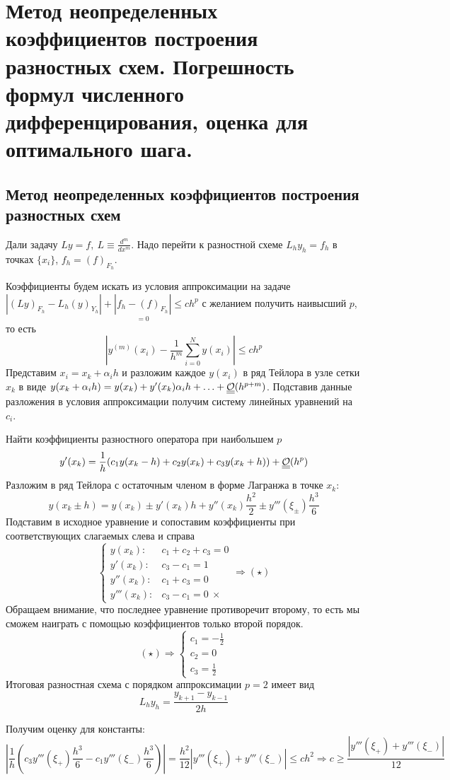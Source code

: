 \section{Метод неопределенных коэффициентов построения
  разностных схем. Погрешность формул
  численного дифференцирования, оценка для оптимального шага.}

\subsection*{Метод неопределенных коэффициентов построения разностных схем}
Дали задачу $Ly=f,\ L\equiv\frac{d^m}{dx^m}$. Надо перейти к разностной схеме
$L_hy_h=f_h$ в точках $\{x_i\}$, $f_h=(f)_{F_h}$.

Коэффициенты будем искать из условия аппроксимации на задаче
$|(Ly)_{F_h}-L_h(y)_{Y_h}|+\underset{=0}{|f_h-(f)_{F_h}|}\leq ch^p$ с желанием
получить наивысший $p$, то есть
\[\left|y^{(m)}(x_i)-\frac{1}{h^m}\sum_{i=0}^{N}y(x_i)\right|\leq ch^p\]
Представим $x_i=x_k+\alpha_ih$ и разложим каждое $y(x_i)$
в ряд Тейлора в узле сетки $x_k$ в виде $y(x_k+\alpha_ih)=y(x_k)+y'(x_k)\alpha_ih+\ldots+\underline{\underline{\mathcal{O}}}(h^{p+m})$.
Подставив данные разложения в условия аппроксимации получим систему линейных уравнений на $c_i$.

\begin{example}
  Найти коэффициенты разностного оператора при наибольшем $p$
  \[y'(x_k)=\frac{1}{h}(c_1y(x_k-h)+c_2y(x_k)+c_3y(x_k+h))+\underline{\underline{\mathcal{O}}}(h^p)\]
  Разложим в ряд Тейлора с остаточным членом в форме Лагранжа в точке $x_k$:
  \[y(x_k\pm h)=y(x_k)\pm y'(x_k)h+y''(x_k)\frac{h^2}{2}\pm y'''(\xi_{\pm})\frac{h^3}{6}\]
  Подставим в исходное уравнение и сопоставим коэффициенты при соответствующих слагаемых слева и справа
  \[\begin{cases}
      y(x_k):    & c_1+c_2+c_3=0     \\
      y'(x_k):   & c_3-c_1=1         \\
      y''(x_k):  & c_1+c_3=0         \\
      y'''(x_k): & c_3-c_1=0\ \times
    \end{cases}\Rightarrow (\star)\]
  Обращаем внимание, что последнее уравнение противоречит второму, то есть
  мы сможем наиграть с помощью коэффициентов только второй порядок.
  \[(\star)\Rightarrow\begin{cases}
      c_1=-\frac{1}{2} \\
      c_2=0            \\
      c_3=\frac{1}{2}
    \end{cases}\]
  Итоговая разностная схема с порядком аппроксимации $p=2$ имеет вид
  \[L_hy_h=\frac{y_{k+1}-y_{k-1}}{2h}\]

  Получим оценку для константы:
  \[\left|\frac{1}{h}(c_3y'''(\xi_{+})\frac{h^3}{6}-c_1y'''(\xi_{-})\frac{h^3}{6})\right|=\frac{h^2}{12}\left|y'''(\xi_{+})+y'''(\xi_{-})\right|\leq ch^2\Rightarrow c\geq\frac{|y'''(\xi_{+})+y'''(\xi_{-})|}{12}\]
\end{example}

